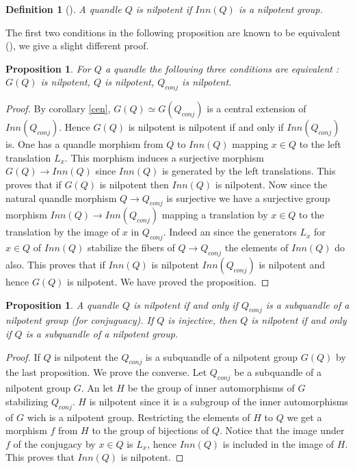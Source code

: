 \documentclass[12pt, reqno]{amsart}
\newtheorem{proposition}[theorem]{Proposition}
\newtheorem{definition}[theorem]{Definition}
\begin{document}
\begin{definition}[\cite{dar}]
A quandle $Q$ is nilpotent if $Inn(Q)$ is a nilpotent group.
\end{definition}
The first two conditions in the following proposition are known to be equivalent (\cite{dar}), we give a slight different proof.
\begin{proposition}
For $Q$ a quandle the following three conditions are equivalent : $G(Q)$ is nilpotent, $Q$ is nilpotent, $Q_{conj}$ is nilpotent.
\end{proposition}
\begin{proof}
By corollary \ref{cen}, $G(Q)\simeq G(Q_{conj})$ is a central extension of $Inn(Q_{conj})$. Hence $G(Q)$ is nilpotent is nilpotent if and only if $Inn(Q_{conj})$ is. One has a quandle morphism from $Q$ to $Inn(Q)$ mapping $x\in Q$ to the left translation $L_x$. This morphism induces a surjective morphism $G(Q) \to Inn(Q)$ since $Inn(Q)$ is generated by the left translations. This proves that if $G(Q)$ is nilpotent then $Inn(Q)$ is nilpotent. Now since the natural quandle morphism $Q\to Q_{conj}$ is surjective we have a surjective group morphism $Inn(Q)\to Inn(Q_{conj})$ mapping a translation by $x\in Q$ to the translation by the image of $x$ in $Q_{conj}$. Indeed an since the generators $L_x$ for $x\in Q$ of $Inn(Q)$ stabilize the fibers of $Q\to Q_{conj}$ the elements of $Inn(Q)$ do also. This proves that if $Inn(Q)$ is nilpotent $Inn(Q_{conj})$ is nilpotent and hence $G(Q)$ is nilpotent. We have proved the proposition.
\end{proof}
\begin{proposition}
A quandle $Q$ is nilpotent if and only if $Q_{conj}$ is a subquandle of a nilpotent group (for conjuguacy). If $Q$ is injective, then $Q$ is nilpotent if and only if $Q$ is a subquandle of a nilpotent group.
\end{proposition}
\begin{proof}
If $Q$ is nilpotent the $Q_{conj}$ is a subquandle of a nilpotent group $G(Q)$ by the last proposition. We prove the converse. Let $Q_{conj}$ be a subquandle of a nilpotent group $G$. An let $H$ be the group of inner automorphisms of $G$ stabilizing $Q_{conj}$. $H$ is nilpotent since it is a subgroup of the inner automorphisms of $G$ wich is a nilpotent group. Restricting the elements of $H$ to $Q$ we get a morphism $f$ from $H$ to the group of bijections of $Q$. Notice that the image under $f$ of the conjugacy by $x\in Q$ is $L_x$, hence $Inn(Q)$ is included in the image of $H$. This proves that $Inn(Q)$ is nilpotent.  
\end{proof}
\end{document}

